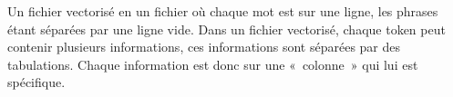 \documentclass[manual-fr.tex]{subfiles}
\begin{document}
Un fichier vectorisé en un fichier où chaque mot est sur une ligne, les phrases étant séparées par une ligne vide. Dans un fichier vectorisé, chaque token peut contenir plusieurs informations, ces informations sont séparées par des tabulations. Chaque information est donc sur une «\ colonne\ » qui lui est spécifique.
\end{document}
